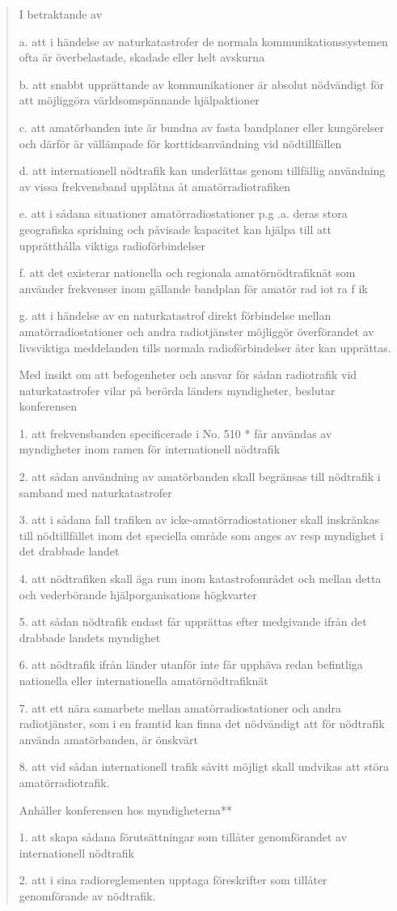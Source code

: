 \begin{quote}
I betraktande av

a. att i händelse av naturkatastrofer de normala kommunikationssystemen ofta är
överbelastade, skadade eller helt avskurna

b. att snabbt upprättande av kommunikationer är absolut nödvändigt för att
möjliggöra världsomspännande hjälpaktioner

c. att amatörbanden inte är bundna av fasta bandplaner eller kungörelser och
därför är vällämpade för korttidsanvändning vid nödtillfällen

d. att internationell nödtrafik kan underlättas genom tillfällig användning av
vissa frekvensband upplåtna åt amatörradiotrafiken

e. att i sådana situationer amatörradiostationer p.g .a. deras stora geografiska
spridning och påvisade kapacitet kan hjälpa till att upprätthålla viktiga
radioförbindelser

f. att det existerar nationella och regionala amatörnödtrafiknät som använder
frekvenser inom gällande bandplan för amatör rad iot ra f ik

g. att i händelse av en naturkatastrof direkt förbindelse mellan
amatörradiostationer och andra radiotjänster möjliggör överförandet av
livsviktiga meddelanden tills normala radioförbindelser åter kan upprättas.

Med
insikt om att befogenheter och ansvar för sådan radiotrafik vid naturkatastrofer
vilar på berörda länders myndigheter, beslutar konferensen

1. att frekvensbanden specificerade i No. 510 * får användas av myndigheter
inom ramen för internationell nödtrafik

2. att sådan användning av amatörbanden skall begränsas till nödtrafik i samband
med naturkatastrofer

3. att i sådana fall trafiken av icke-amatörradiostationer skall inskränkas till
nödtillfället inom det speciella område som anges av resp myndighet i det
drabbade landet

4. att nödtrafiken skall äga rum inom katastrofområdet och mellan detta och
vederbörande hjälporganisations högkvarter

5. att sådan nödtrafik endast får upprättas efter medgivande ifrån det drabbade
landets myndighet

6. att nödtrafik ifrån länder utanför inte får upphäva redan befintliga
nationella eller internationella amatörnödtrafiknät

7. att ett nära samarbete mellan amatörradiostationer och andra radiotjänster,
som i en framtid kan finna det nödvändigt att för nödtrafik använda
amatörbanden, är önskvärt

8. att vid sådan internationell trafik såvitt möjligt skall undvikas att störa
amatörradiotrafik.

Anhåller konferensen hos myndigheterna**

1. att skapa sådana förutsättningar som tillåter genomförandet av internationell
nödtrafik

2. att i sina radioreglementen upptaga föreskrifter som tillåter genomförande av
nödtrafik.
\end{quote}


